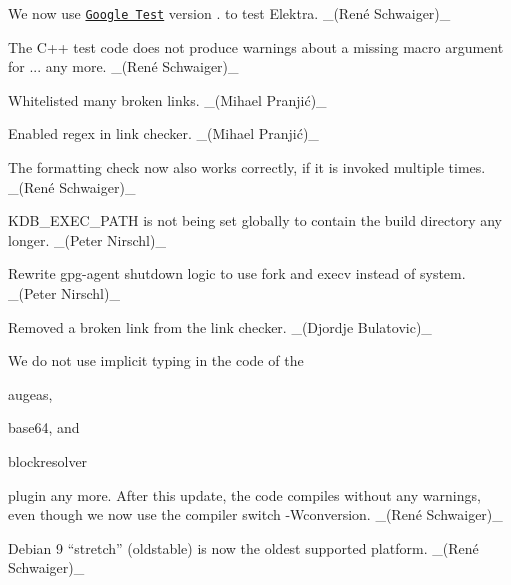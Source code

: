 \begin{DoxyItemize}
\item We now use \href{https://github.com/google/googletest}{\tt Google Test} version {.} to test Elektra. \+\_\+(René Schwaiger)\+\_\+
\item The C++ test code does not produce warnings about a missing macro argument for {\ttfamily ...} any more. \+\_\+(René Schwaiger)\+\_\+
\item Whitelisted many broken links. \+\_\+(Mihael Pranjić)\+\_\+
\item Enabled regex in link checker. \+\_\+(Mihael Pranjić)\+\_\+
\item The formatting check now also works correctly, if it is invoked multiple times. \+\_\+(René Schwaiger)\+\_\+
\item {\ttfamily K\+D\+B\+\_\+\+E\+X\+E\+C\+\_\+\+P\+A\+TH} is not being set globally to contain the build directory any longer. \+\_\+(\+Peter Nirschl)\+\_\+
\item Rewrite gpg-\/agent shutdown logic to use {\ttfamily fork} and {\ttfamily execv} instead of {\ttfamily system}. \+\_\+(\+Peter Nirschl)\+\_\+
\item Removed a broken link from the link checker. \+\_\+(\+Djordje Bulatovic)\+\_\+
\end{DoxyItemize}


\begin{DoxyItemize}
\item We do not use implicit typing in the code of the
\begin{DoxyItemize}
\item {\ttfamily augeas},
\item {\ttfamily base64}, and
\item {\ttfamily blockresolver}
\end{DoxyItemize}

plugin any more. After this update, the code compiles without any warnings, even though we now use the compiler switch {\ttfamily -\/\+Wconversion}. \+\_\+(René Schwaiger)\+\_\+
\end{DoxyItemize}


\begin{DoxyItemize}
\item Debian 9 “stretch” (oldstable) is now the oldest supported platform. \+\_\+(René Schwaiger)\+\_\+
\end{DoxyItemize}


